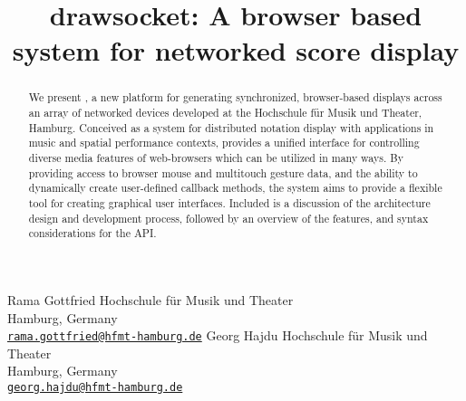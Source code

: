 

\def\papertitle{drawsocket: A browser based system for networked score display%
}

\def\Hochschule {Hochschule f\"ur Musik und Theater}

\def\firstauthor{Rama Gottfried}
\def\secondauthor{Georg Hajdu}


\title{\papertitle}
 \twoauthors
   {\firstauthor} {	
      Hochschule f\"ur Musik und Theater\\
        Hamburg, Germany \\ %
   \small{\tt \href{mailto:rama.gottfried@hfmt-hamburg.de}{rama.gottfried@hfmt-hamburg.de}}}
    {\secondauthor} {
   Hochschule f\"ur Musik und Theater\\
   Hamburg, Germany \\ %
   \small{\tt \href{mailto:georg.hajdu@hfmt-hamburg.de}{georg.hajdu@hfmt-hamburg.de}}}


 





%

\capstartfalse
\maketitle
\capstarttrue
%
\begin{abstract}
We present \drawsocket, a new platform for generating synchronized, browser-based displays across an array of networked devices developed at the \Hochschule, Hamburg. 
Conceived as a system for distributed notation display with applications in music and spatial performance contexts, \drawsocket provides a unified interface for controlling diverse media features of web-browsers which can be utilized in many ways.
By providing access to browser mouse and multitouch gesture data, and the ability to dynamically create user-defined callback methods, the \drawsocket system aims to provide a flexible tool for creating graphical user interfaces.
Included is a discussion of the architecture design and development process, followed by an overview of the features, and syntax considerations for the \drawsocket API.

\end{abstract}

